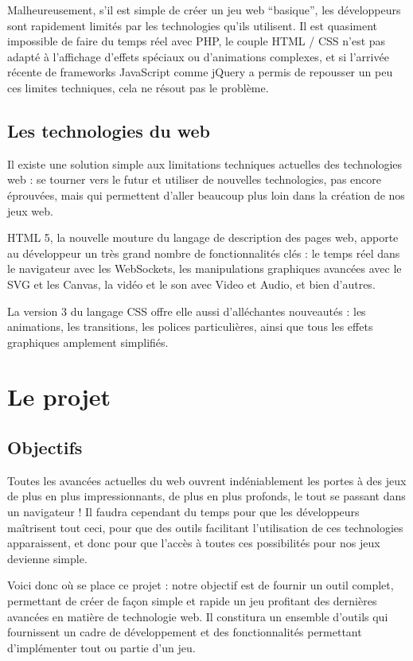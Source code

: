 \documentclass[a4paper,10pt]{report}
\begin{document}
Malheureusement, s’il est simple de créer un jeu web “basique”, les développeurs sont rapidement limités par les technologies qu’ils utilisent. Il est quasiment impossible de faire du temps réel avec PHP, le couple HTML / CSS n’est pas adapté à l’affichage d’effets spéciaux ou d’animations complexes, et si l’arrivée récente de frameworks JavaScript comme jQuery a permis de repousser un peu ces limites techniques, cela ne résout pas le problème.

\section{Les technologies du web}
Il existe une solution simple aux limitations techniques actuelles des technologies web : se tourner vers le futur et utiliser de nouvelles technologies, pas encore éprouvées, mais qui permettent d’aller beaucoup plus loin dans la création de nos jeux web.

HTML 5, la nouvelle mouture du langage de description des pages web, apporte au développeur un très grand nombre de fonctionnalités clés : le temps réel dans le navigateur avec les WebSockets, les manipulations graphiques avancées avec le SVG et les Canvas, la vidéo et le son avec Video et Audio, et bien d’autres.

La version 3 du langage CSS offre elle aussi d’alléchantes nouveautés : les animations, les transitions, les polices particulières, ainsi que tous les effets graphiques amplement simplifiés.

\chapter{Le projet}

\section{Objectifs}
Toutes les avancées actuelles du web ouvrent indéniablement les portes à des jeux de plus en plus impressionnants, de plus en plus profonds, le tout se passant dans un navigateur ! Il faudra cependant du temps pour que les développeurs maîtrisent tout ceci, pour que des outils facilitant l’utilisation de ces technologies apparaissent, et donc pour que l’accès à toutes ces possibilités pour nos jeux devienne simple.

Voici donc où se place ce projet : notre objectif est de fournir un outil complet, permettant de créer de façon simple et rapide un jeu profitant des dernières avancées en matière de technologie web. Il constitura un ensemble d'outils qui fournissent un cadre de développement et des fonctionnalités permettant d'implémenter tout ou partie d'un jeu.
\end{document}
